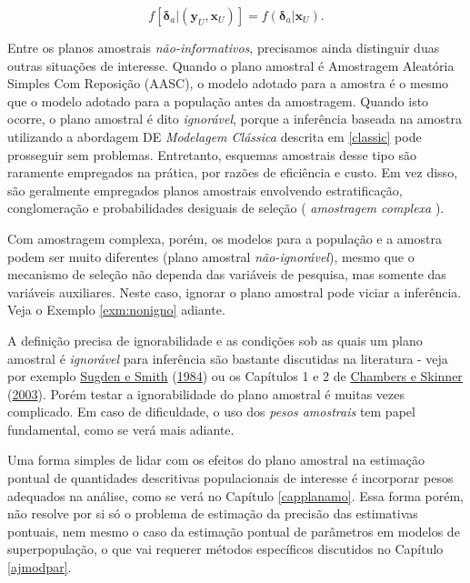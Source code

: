 \documentclass[
  12pt,
  brazilian,
]{book}
\theoremstyle{definition}
\theoremstyle{definition}
\theoremstyle{definition}
\theoremstyle{definition}
\theoremstyle{remark}
\begin{document}
\begin{equation}
f\left[ \mathbf{\delta }_a | \left( \mathbf{y}_U , \mathbf{x}_U \right)
\right] = f\left( \mathbf{\delta }_a | \mathbf{x}_U \right) . \label{eq:ref7}
\end{equation}

Entre os planos amostrais \emph{não-informativos}, precisamos ainda distinguir duas
outras situações de interesse. Quando o plano amostral é Amostragem Aleatória
Simples Com Reposição (AASC), o modelo adotado para a amostra é o mesmo que o
modelo adotado para a população antes da amostragem. Quando isto ocorre, o plano
amostral é dito \emph{ignorável}, porque a inferência baseada na amostra utilizando a
abordagem DE \emph{Modelagem Clássica} descrita em \ref{classic} pode prosseguir sem
problemas. Entretanto, esquemas amostrais desse tipo são raramente empregados na
prática, por razões de eficiência e custo. Em vez disso, são geralmente
empregados planos amostrais envolvendo estratificação, conglomeração e
probabilidades desiguais de seleção ( \emph{amostragem complexa} ).

Com amostragem complexa, porém, os modelos para a população e a amostra podem
ser muito diferentes (plano amostral \emph{não-ignorável}), mesmo que o mecanismo de
seleção não dependa das variáveis de pesquisa, mas somente das variáveis
auxiliares. Neste caso, ignorar o plano amostral pode viciar a inferência. Veja
o Exemplo \ref{exm:nonigno} adiante.

A definição precisa de ignorabilidade e as condições sob as quais um plano
amostral é \emph{ignorável} para inferência são bastante discutidas na literatura -
veja por exemplo \protect\hyperlink{ref-Sugden84}{Sugden e Smith} (\protect\hyperlink{ref-Sugden84}{1984}) ou os Capítulos 1 e 2 de \protect\hyperlink{ref-CHSK2003}{Chambers e Skinner} (\protect\hyperlink{ref-CHSK2003}{2003}). Porém testar
a ignorabilidade do plano amostral é muitas vezes complicado. Em caso de
dificuldade, o uso dos \emph{pesos amostrais} tem papel fundamental, como se verá
mais adiante.

Uma forma simples de lidar com os efeitos do plano amostral na estimação pontual
de quantidades descritivas populacionais de interesse é incorporar pesos
adequados na análise, como se verá no Capítulo \ref{capplanamo}. Essa forma
porém, não resolve por si só o problema de estimação da precisão das estimativas
pontuais, nem mesmo o caso da estimação pontual de parâmetros em modelos de
superpopulação, o que vai requerer métodos específicos discutidos no Capítulo
\ref{ajmodpar}.
\end{document}

